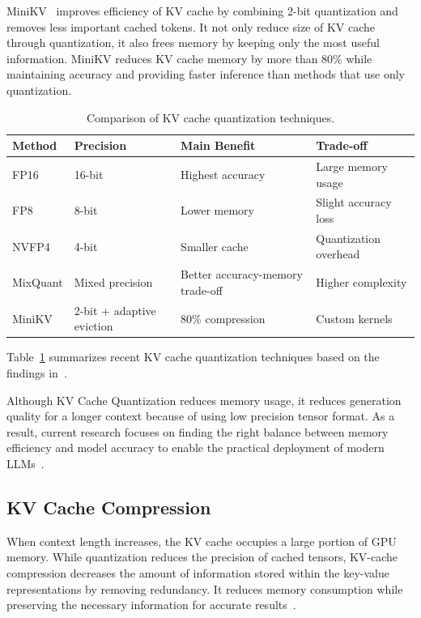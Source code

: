 \documentclass[conference]{IEEEtran}
\begin{document}
MiniKV~\cite{sharma2025minikv} improves efficiency of KV cache by combining 2-bit quantization and removes less important cached tokens. It not only reduce size of KV cache through quantization, it also frees memory by keeping only the most useful information. MiniKV reduces KV cache memory by more than 80\% while maintaining accuracy and providing faster inference than methods that use only quantization.
\begin{table}[htbp]
	\centering
	\caption{Comparison of KV cache quantization techniques.}
	\label{tab:kv_quantization}
	\small
	\begin{tabularx}{\linewidth}{llXX}
		\toprule
		\textbf{Method} & \textbf{Precision}        & \textbf{Main Benefit}            & \textbf{Trade-off}    \\
		\midrule
		FP16            & 16-bit                    & Highest accuracy                 & Large memory usage    \\
		\midrule
		FP8             & 8-bit                     & Lower memory                     & Slight accuracy loss  \\
		\midrule
		NVFP4           & 4-bit                     & Smaller cache                    & Quantization overhead \\
		\midrule
		MixQuant        & Mixed precision           & Better accuracy-memory trade-off & Higher complexity     \\
		\midrule
		MiniKV          & 2-bit + adaptive eviction & 80\% compression                 & Custom kernels        \\
		\bottomrule
	\end{tabularx}
\end{table}

Table~\ref{tab:kv_quantization} summarizes recent KV cache quantization techniques based on the findings in~\cite{nvidia2025nvfp4,lu2026mixquant,sharma2025minikv}.

Although KV Cache Quantization reduces memory usage, it reduces generation quality for a longer context because of using low precision tensor format. As a result, current research focuses on finding the right balance between memory efficiency and model accuracy to enable the practical deployment of modern LLMs~\cite{nvidia2025nvfp4,lu2026mixquant,sharma2025minikv}.

\subsection{KV Cache Compression}
When context length increases, the KV cache occupies a large portion of GPU memory. While quantization reduces the precision of cached tensors, KV-cache compression decreases the amount of information stored within the key-value representations by removing redundancy. It reduces memory consumption while preserving the necessary information for accurate results~\cite{shan2025cognitivememoryllms}.
\end{document}
